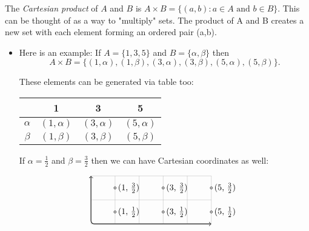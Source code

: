 \documentclass{amsart} %
\theoremstyle{definition} %
\theoremstyle{definition}
\theoremstyle{remark} %
\begin{document}
\medskip
\noindent {} \quad The \emph{Cartesian product} of $A$ and $B$ is $A \times B = \{(a,b): a \in A \text{ and } b \in B \} $. This can be thought of as a way to "multiply" sets. The product of A and B creates a new set with each element forming an ordered pair (a,b).
      \begin{itemize}
            \item Here is an example: If $A = \{1, 3, 5 \}$ and $B = \{\alpha, \beta \} $ then
                  \[ A \times B = \{(1, \alpha), (1, \beta), (3, \alpha), (3, \beta), (5, \alpha), (5, \beta) \}. \]

                  These elements can be generated via table too:
                  \begin{center}
                  \begin{tabular}{c | c | c | c}
                        & 1 & 3 & 5 \\
                        \hline
                        $\alpha$ & $(1, \alpha)$ & $(3, \alpha)$ & $(5, \alpha)$ \\
                        $\beta$ & $(1, \beta)$ & $(3, \beta)$ & $(5, \beta)$ \\
                  \end{tabular}
                  \end{center}

                  If $\alpha = \frac{1}{2}$ and $\beta = \frac{3}{2}$ then we can have Cartesian coordinates as well:

                 \[ \begin{tikzpicture}
                        \draw[<->, rounded corners, thick] (0,2) -- (0,0) -- (5, 0);
                        \draw[help lines] (0, 0) grid (5, 2);
                        \draw[fill = lightgray] (1, 0.5) circle [radius = 0.05];
                        \node [right] at (1, 0.5) {(1, $\frac{1}{2}$)};
                        \draw[fill = lightgray] (3, 0.5) circle [radius = 0.05];
                        \node [right] at (3, 0.5) {(3, $\frac{1}{2}$)};
                        \draw[fill = lightgray] (5, 0.5) circle [radius = 0.05];
                        \node [right] at (5, 0.5) {(5, $\frac{1}{2}$)};
                        \draw[fill = lightgray] (1, 1.5) circle [radius = 0.05];
                        \node [right] at (1, 1.5) {(1, $\frac{3}{2}$)};
                        \draw[fill = lightgray] (3, 1.5) circle [radius = 0.05];
                        \node [right] at (3, 1.5) {(3, $\frac{3}{2}$)};
                        \draw[fill = lightgray] (5, 1.5) circle [radius = 0.05];
                        \node [right] at (5, 1.5) {(5, $\frac{3}{2}$)};
                  \end{tikzpicture} \]

      \end{itemize}
\end{document}
